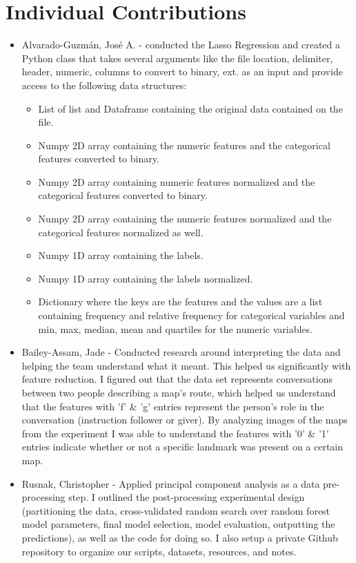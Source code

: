 \documentclass[twoside,11pt]{article}
\begin{document}
\section{Individual Contributions}
\begin{itemize}
	\item Alvarado-Guzm\'an, Jos\'e A. - conducted the Lasso Regression and created a Python class that takes several arguments like the file location, delimiter, header,  numeric, columns to convert to binary, ext. as an input and provide access to the following data structures:
	\begin{itemize}
		\item List of list and Dataframe containing the original data contained on the file.
		\item Numpy 2D array containing the numeric features and the categorical features converted to binary.
		\item Numpy 2D array containing numeric features normalized and the categorical features converted to binary.
		\item Numpy 2D array containing the numeric features normalized and the categorical features normalized as well.
		\item Numpy 1D array containing the labels.
		\item Numpy 1D array containing the labels normalized.
		\item Dictionary where the keys are the features and the values are a list containing frequency and relative frequency for categorical variables and min, max, median, mean and quartiles for the numeric variables.
	\end{itemize}
	\item Bailey-Assam, Jade - Conducted research around interpreting the data and helping the team understand what it meant. This helped us significantly with feature reduction.  I figured out that the data set represents conversations between two people describing a map's route, which helped us understand that the features with 'f' \& 'g' entries represent the person's role in the conversation (instruction follower or giver). By analyzing images of the maps from the experiment I was able to understand the features with '0' \& '1' entries indicate whether or not a specific landmark was present on a certain map.
	\item Rusnak, Christopher - Applied principal component analysis as a data pre-processing step. I outlined the post-processing experimental design (partitioning the data, cross-validated random search over random forest model parameters, final model selection, model evaluation, outputting the predictions), as well as the code for doing so. I also setup a private Github repository to organize our scripts, datasets, resources, and notes.
\end{itemize}
\end{document}

